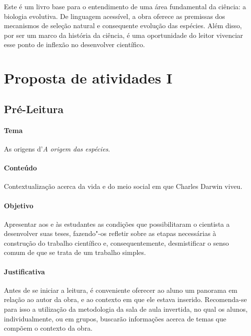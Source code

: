 \documentclass[11pt]{extarticle}
\begin{document}
Este é um livro base para o entendimento de uma área fundamental da ciência:
a biologia evolutiva. De linguagem acessível, a obra oferece as premissas dos mecanismos de seleção
natural e consequente evolução das espécies.
Além disso, por ser um marco da história da ciência, é uma oportunidade do
leitor vivenciar esse ponto de inflexão no desenvolver científico.





\section{Proposta de atividades I}


\subsection{Pré-Leitura}

\paragraph{Tema} As origens d'\textit{A origem das espécies}.

\paragraph{Conteúdo} Contextualização acerca da vida e do meio social
em que Charles Darwin viveu.

\paragraph{Objetivo} Apresentar aos e às estudantes as condições
que possibilitaram o cientista a desenvolver suas teses, fazendo"-os
refletir sobre as etapas necessárias à construção do trabalho científico
e, consequentemente, desmistificar o senso comum de que se trata de 
um trabalho simples.

\paragraph{Justificativa} Antes de se iniciar a leitura, é conveniente oferecer ao 
aluno um panorama em
relação ao autor da obra, e ao contexto em que ele estava inserido.
Recomenda-se para isso a utilização da metodologia da sala de aula invertida,
no qual os alunos, individualmente, ou em grupos, buscarão informações acerca
de temas que compõem o contexto da obra.
\end{document}
